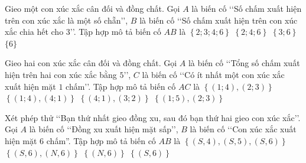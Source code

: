 \begin{ex}%
	Gieo một con xúc xắc cân đối và đồng chất. Gọi $A$ là biến cố \lq\lq Số chấm xuất hiện trên con xúc xắc là một số chẵn\rq\rq, $B$ là biến  cố \lq\lq Số chấm xuất hiện trên con xúc xắc chia hết cho $3$\rq\rq. Tập hợp mô tả biến cố $AB$ là
	 \choice
		{$\left\{2; 3; 4;  6\right\}$}
		{$\left\{2; 4; 6\right\}$} 
		{$\left\{3; 6\right\}$} 
		 {\True $\{6\}$}
\end{ex}

\begin{ex}%
	Gieo hai con xúc xắc cân đối và đồng chất. Gọi $A$ là biến cố \lq\lq Tổng số chấm xuất hiện trên hai con xúc xắc bằng $5$\rq\rq, $C$ là biến cố \lq\lq Có ít nhất một con xúc xắc xuất hiện mặt $1$ chấm\rq\rq. Tập hợp mô tả biến cố $AC$  là
	\choice 
		 {$\left\{(1; 4), (2; 3)\right\}$}
		{\True $\left\{(1; 4), (4;  1)\right\}$}
		{$\left\{(4; 1), (3;  2)\right\}$}
		{$\left\{(1; 5), (2; 3)\right\}$} 
\end{ex}

\begin{ex}%
	Xét phép thử \lq\lq Bạn thứ nhất gieo đồng xu, sau đó bạn thứ hai gieo con xúc xắc\rq\rq. Gọi $A$ là biến cố \lq\lq Đồng xu xuất hiện mặt sấp\rq\rq,  $B$ là biến cố \lq\lq Con xúc xắc xuất hiện mặt $6$ chấm''. Tập hợp mô tả biến cố $AB$ là
	 \choice
		{$\left\{(S, 4),(S, 5),(S, 6)\right\}$} 
		{$\left\{(S,  6),(N, 6)\right\}$}
		 {$\left\{(N, 6)\right\}$}
		 {\True $\left\{(S, 6)\right\}$}
\end{ex}



